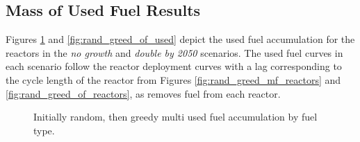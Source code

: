 \subsection{Mass of Used Fuel Results}
\label{sec:rand_greed_used}

Figures \ref{fig:rand_greed_mf_used} and \ref{fig:rand_greed_of_used} depict the used fuel accumulation for the reactors in the \textit{no growth} and \textit{double by 2050} scenarios. The used fuel curves in each scenario follow the reactor deployment curves with a lag corresponding to the cycle length of the reactor from Figures \ref{fig:rand_greed_mf_reactors} and \ref{fig:rand_greed_of_reactors}, as \cyclus removes fuel from each reactor.


\begin{figure}[H]
    \hfill
    \caption{Initially random, then greedy multi used fuel accumulation by fuel type.}
    \label{fig:rand_greed_mf_used}
  \end{figure}


